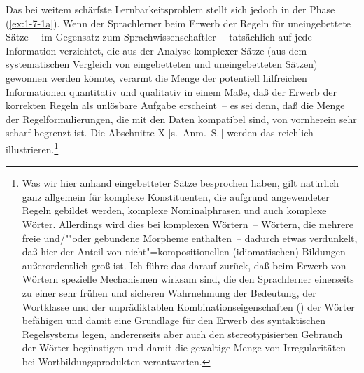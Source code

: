 \documentclass[output=paper]{langsci/langscibook}
\begin{document}
Das bei weitem schärfste Lernbarkeitsproblem stellt sich jedoch in der
Phase (\ref{ex:1-7-1a}). Wenn der Sprachlerner beim Erwerb der Regeln
für uneingebettete Sätze~-- im Gegensatz zum Sprachwissenschaftler~--
tatsächlich auf jede Information verzich\-tet, die aus der Analyse
komplexer Sätze (\zb aus dem systematischen Vergleich von
eingebetteten und uneingebetteten Sätzen) gewonnen werden könnte,
verarmt die Menge der potentiell hilfreichen Informationen quantitativ
und qualitativ in einem Maße,
daß der Erwerb der korrekten Regeln als unlösbare Aufgabe erscheint~-- es sei denn,
daß die Menge der Regelformulierungen, die mit den Daten kompatibel sind, von
vornherein sehr scharf begrenzt ist. Die Abschnitte X
[s.\ Anm.\ S.\,\pageref{fn-herausgeber-topo}]\label{X:3} werden das reichlich
illustrieren.\footnote{%
  Was wir hier anhand eingebetteter Sätze besprochen haben, gilt natürlich ganz allgemein für
  komplexe Konstituenten, die aufgrund  angewendeter Regeln gebildet werden, \zb komplexe
  Nominalphrasen und auch komplexe Wörter. Allerdings wird dies bei komplexen Wörtern~-- Wörtern,
  die mehrere freie und/""oder gebundene Morpheme enthalten~-- dadurch etwas verdunkelt, daß hier
  der Anteil von nicht"=kompositionellen (idiomatischen) Bildungen außerordentlich groß ist. Ich
  führe das darauf zurück, daß beim Erwerb von Wörtern spezielle Mechanismen wirksam sind, die den
  Sprachlerner einerseits zu einer sehr frühen und sicheren Wahrnehmung der Bedeutung, der
  Wortklasse und der unprädiktablen Kombinationseigenschaften () der Wörter befähigen
  und damit eine Grundlage für den Erwerb des syntaktischen Regelsystems legen, andererseits aber
  auch den stereotypisierten Gebrauch der Wörter begünstigen und damit die gewaltige Menge von
  Irregularitäten bei Wortbildungsprodukten verantworten.%
}

\ssubsection{}%
\label{subsec:1-7.3}
\end{document}
